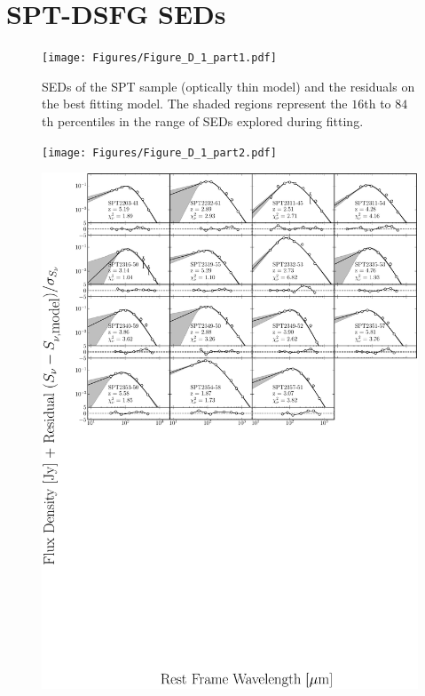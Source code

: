 \chapter{SPT-DSFG SEDs}

\begin{figure}
	\centering
	\caption[SEDs of SPT sample (Optically thin)]{SEDs of the SPT sample (optically thin model) and the residuals on the best fitting model. The shaded regions represent the $16$th to $84$th percentiles in the range of SEDs explored during fitting.}
	\texttt{[image: Figures/Figure\_D\_1\_part1.pdf]}
\end{figure}
\begin{figure}
	\centering
	\texttt{[image: Figures/Figure\_D\_1\_part2.pdf]}
\end{figure}
\begin{figure}
	\centering
	\includegraphics[width=\columnwidth]{Figures/Figure_D_1_part3.pdf}
\end{figure}


